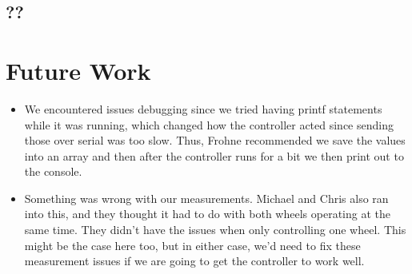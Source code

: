 \documentclass{article}
\begin{document}
\subsection{??}

\section{Future Work}
\begin{itemize}
\item We encountered issues debugging since we tried having printf statements while it was running, which changed how the controller acted since sending those over serial was too slow. Thus, Frohne recommended we save the values into an array and then after the controller runs for a bit we then print out to the console.
\item Something was wrong with our measurements. Michael and Chris also ran into this, and they thought it had to do with both wheels operating at the same time. They didn't have the issues when only controlling one wheel. This might be the case here too, but in either case, we'd need to fix these measurement issues if we are going to get the controller to work well.
\end{itemize}
\end{document}
